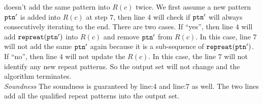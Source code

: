 \begin{enumerate}
doesn't add the same pattern into $R(c)$ twice.
We first assume a new pattern $\mathtt{ptn}'$ is added into $R(c)$ at step $7$, 
%
then line $4$ will check if $\mathtt{ptn}'$ will always consecutively iterating to the end.
There are two cases.
If ``yes'', then line $4$ will add $\mathtt{repreat}(\mathtt{ptn}')$ into $R(c)$ and remove $\mathtt{ptn}'$ from $R(c)$.
In this case, line $7$ will not add the same $\mathtt{ptn}'$ again because it is a sub-sequence of $\mathtt{repreat}(\mathtt{ptn}')$.
If ``no'', then line $4$ will not update the $R(c)$. 
In this case, the line $7$ will not identify any new repeat patterns. So the output set will not change and the algorithm terminates.
\\
\emph{Soundness} 
The soundness is guaranteed by line:4 and line:7 as well.
The two lines add all the qualified repeat patterns into the output set.
\end{enumerate}
%
